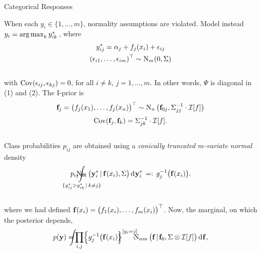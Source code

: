 \documentclass{beamer}
\newlength{\onecolwid}
\newlength{\twocolwid}
\newlength{\threecolwid}
\begin{document}
\begin{frame}[t]
\begin{columns}[t]
\begin{column}{\threecolwid}
\begin{columns}[t,totalwidth=\threecolwid]
\begin{columns}[t,totalwidth=\twocolwid]
\begin{column}{\twocolwid}
\begin{columns}[t,totalwidth=\twocolwid]
\begin{column}{\onecolwid}
\begin{block}{Categorical Responses}
\vspace{2pt}

When each $y_i \in \{ 1,\dots,m \}$, normality assumptions are violated.
Model instead $y_i = \operatorname*{arg\,max}_k y_{ik}^*\,$, where %
~\\[-18pt]
\begin{align}\label{eq:iprobit}
  \begin{gathered}
    y_{ij}^* = \alpha_j + f_j(x_i) + \epsilon_{ij} \\    
    (\epsilon_{i1},\dots,\epsilon_{im})^\top \sim \operatorname{N}_m(0, \Sigma) \\
  \end{gathered}
\end{align}
~\\[-5pt]
with $\operatorname{Cov}(\epsilon_{ij},\epsilon_{kj}) = 0$, for all $i\neq k$, $j=1,\dots,m$.
In other words, $\Psi$ is diagonal in (1) and (2). 
The I-prior is
~\\[-18pt]
\begin{align*}
  \begin{gathered}
    {\mathbf f}_j = \big(f_j(x_1),\dots,f_j(x_n) \big)^\top \sim \operatorname{N}_n \big({\mathbf f}_{0j}, \Sigma^{-1}_{jj}\cdot{\mathcal I}[f] \big) \\[0.5ex]
    \operatorname{Cov}( {\mathbf f}_j, {\mathbf f}_k) = \Sigma^{-1}_{jk} \cdot{\mathcal I}[f].
  \end{gathered}
\end{align*}
~\\[-5pt]
Class probabilities $p_{ij}$ are obtained using a \emph{conically truncated $m$-variate normal} density
~\\[-14pt]
\[
  p_{ij} = 
  \hspace{-1.3cm}
  \mathop{\int}_{\{y_{ij}^* > y_{ik}^* \,|\, k \neq j \}}
  \hspace{-1.3cm}
  \N_m\big(\by^*_i \,|\, \bff(x_i),\Sigma\big) \d\by_i^* \, =: \, g_j^{-1}\big(\bff(x_i)\big).
\]
~\\[-9pt]
where we had defined ${\mathbf f}(x_i) = \big(f_1(x_i),\dots,f_m(x_i)\big)^\top$.
Now, the marginal, on which the posterior depends,
~\\[-12pt]
\[
  p(\by) = \hspace{-9pt} \int \hspace{-4pt} \prod_{i,j} \hspace{-2pt} \Big\{ g_j^{-1}\big(\bff(x_i)\big) \hspace{-5pt} \Big\}^{[y_i = j]} \hspace{-10pt}\cdot\hspace{-3pt} \N_{nm}\big(\bff \;\!|\;\! \bff_{0}, \Sigma \otimes \cI[f]\big) \d \bff ,
\]
\end{block}
\end{column}
\end{columns}
\end{column}
\end{columns}
\end{columns}
\end{column}
\end{columns}
\end{frame}
\end{document}
